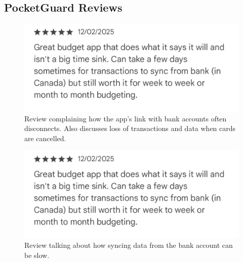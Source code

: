 \documentclass{l4proj}
\begin{document}
\begin{appendices}
\section{PocketGuard Reviews}
\begin{figure}[H]
    \centering
    \includegraphics[width=0.5\linewidth]{images/App-Comparison/pocket-guard-review-2.png}
    \caption{Review complaining how the app’s link with bank accounts often disconnects. Also discusses loss of transactions and data when cards are cancelled.}
    \label{fig:enter-label}
\end{figure}
\begin{figure}[H]
    \centering
    \includegraphics[width=0.5\linewidth]{images/App-Comparison/pocket-guard-review-2.png}
    \caption{Review talking about how syncing data from the bank account can be slow.}
    \label{fig:enter-label}
\end{figure}


\end{appendices}
\end{document}
